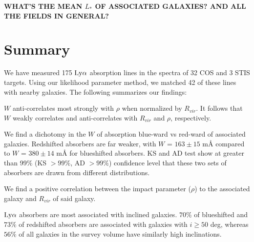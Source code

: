 \documentclass[iop]{emulateapj-rtx4}
\begin{document}
%
%
%
%
%


\textbf{WHAT'S THE MEAN $L_*$ OF ASSOCIATED GALAXIES? AND ALL THE FIELDS IN GENERAL?}

\section{Summary}

We have measured 175 $\rm Ly\alpha$ absorption lines in the spectra of 32 COS and 3 STIS targets. Using our likelihood parameter method, we matched 42 of these lines with nearby galaxies. The following summarizes our findings:

\indent \textbullet \indent $W$ anti-correlates most strongly with $\rho$ when normalized by $R_{vir}$. It follows that $W$ weakly correlates and anti-correlates with $R_{vir}$ and $\rho$, respectively.

\indent \textbullet \indent We find a dichotomy in the $W$ of absorption blue-ward vs red-ward of associated galaxies. Redshifted absorbers are far weaker, with $W$ = $163 \pm 15$ $\textrm{m\AA}$ compared to $W$ = $380 \pm 14$ $\textrm{m\AA}$ for blueshifted absorbers. KS and AD test show at greater than 99\% (KS $>99\%$, AD $>99\%$) confidence level that these two sets of absorbers are drawn from different distributions. 

\indent \textbullet \indent We find a positive correlation between the impact parameter ($\rho$) to the associated galaxy and $R_{vir}$ of said galaxy.

\textbullet \indent $\rm Ly\alpha$ absorbers are most associated with inclined galaxies. $70\%$ of blueshifted and $73\%$ of redshifted absorbers are associated with galaxies with $i \geq 50$ deg, whereas $56\%$ of all galaxies in the survey volume have similarly high inclinations.

\nocite{*}


\end{document}

